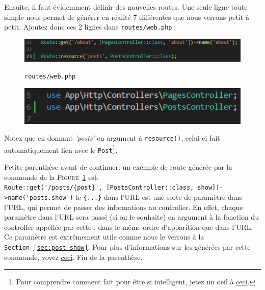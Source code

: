 Ensuite, il faut évidemment définir des nouvelles routes. Une seule ligne toute simple nous permet de générer en réalité 7 \routes{} différentes que nous verrons petit à petit. Ajoutez donc ces 2 lignes dans \verb|routes/web.php|:

\begin{figure}[!h]
    \centering
    \begin{minipage}{0.6\textwidth}
        \centering
        \includegraphics[width=\textwidth]{figures-C1/res_route_1.pdf}
        \caption{\texttt{routes/web.php}}
        \label{fig:post_route}
    \end{minipage}
    \begin{minipage}{0.38\textwidth}
        \centering
        \includegraphics[width=\textwidth]{figures-C1/res_route_2.pdf}
        \caption{}
    \end{minipage}
\end{figure}
\vspace{-0.5cm}
Notez que en donnant \textit{'posts'} en argument à \verb|resource()|, celui-ci fait automatiquement lien avec le \model{} \verb|Post|\footnote{Pour comprendre comment \laravel{} fait pour être si intelligent, jetez un oeil à \href{https://laravel.com/docs/12.x/eloquent#table-names}{ceci}.}.

Petite parenthèse avant de continuer: un exemple de route générée par la commande de la \textsc{Figure~\ref{fig:post_route}} est: \\
\verb|Route::get('/posts/{post}', [PostsController::class, show])->name('posts.show')|
le \verb|{...}| dans l'URL est une sorte de paramètre dans l'URL, qui permet de passer des informations au controller. En effet, chaque paramètre dans l'URL sera passé (si on le souhaite) en argument à la fonction du controller appellée par cette \route, dans le même ordre d'apparition que dans l'URL. Ce paramètre est extrêmement utile comme nous le verrons à la \texttt{Section~\ref{sec:post_show}}. Pour plus d'informations sur les \routes générées par cette commande, voyez \href{https://laravel.com/docs/12.x/controllers}{ceci}. Fin de la parenthèse.

